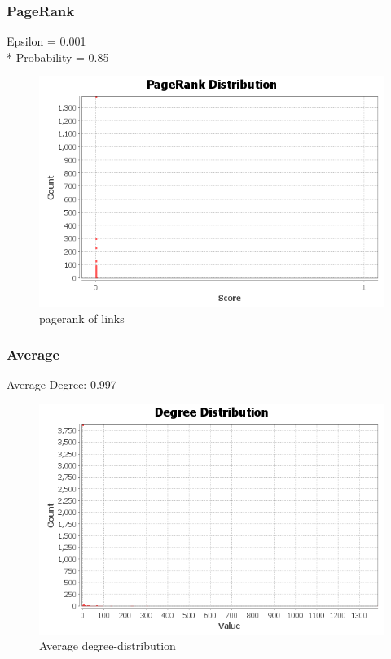 \documentclass[12pt]{article}
\begin{document}
\subsubsection{PageRank}
Epsilon = 0.001\\*
Probability = 0.85
\begin{figure}[h!]
\includegraphics[scale=0.7]{../Q3/pagerank/pageranks}
\centering
\caption{pagerank of links}
\end{figure}
\newpage

\subsubsection{Average}
Average Degree: 0.997
\begin{figure}[!ht]
\includegraphics[scale=0.7]{../Q3/average/degree-distribution}
\centering
\caption{Average degree-distribution}
\end{figure}
\end{document}
